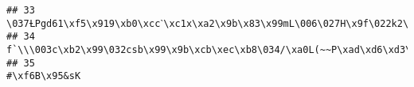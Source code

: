\documentclass[
]{article}
\begin{document}
\begin{verbatim}
## 33                                                                                                                                                                                                                                                                                                                                                                                                                                                                                                                                                                                                                                                                                                                                                                          \037ȽPgd61\xf5\x919\xb0\xccˋ\xc1x\xa2\x9b\x83\x99mL\006\027H\x9f\022k2\xb1'd\x96\xca\b\xfb[\xa8#b#\x8c\xb11\x98\x8du4\030\x9b\030
## 34                                                                                                                                                                                                                                                                                                                                                                                                                                                                                                                                                                                                                                                                                                                                                                                     f`\\\003c\xb2\x99\032csb\x99\x9b\xcb\xec\xb8\034/\xa0L(~~P\xad\xd6\xd3\xd2\xe3\xaeӷZ>\xa3'.\x91\xfe\032\t\xb0P\vG\x9e.
## 35                                                                                                                                                                                                                                                                                                                                                                                                                                                                                                                                                                                                                                                                                                                                                                                                                                                                                              #\xf6B\x95&sK

\end{verbatim}
\end{document}
